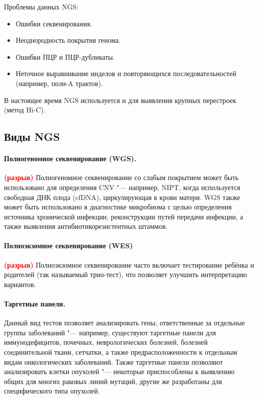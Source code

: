 \documentclass[a4paper,12pt]{article}
\newcommand{\spacing}{\textcolor{red}{\textbf{(разрыв)}}}
\begin{document}
Проблемы данных NGS:

\begin{itemize}
\item Ошибки секвенирования.
\item Неоднородность покрытия генома.
\item Ошибки ПЦР и ПЦР-дубликаты.
\item Неточное выравнивание инделов и повторяющихся последовательностей (например, поли-A трактов).
\end{itemize}

В настоящее время NGS используется и для выявления крупных перестроек (метод Hi-C).

\subsection{Виды NGS}

\paragraph{Полногеномное секвенирование (WGS).}
\spacing
Полногеномное секвенирование со слабым покрытием может быть использовано для определения CNV "--- например, NIPT, когда используется свободная ДНК плода (cfDNA), циркулирующая в крови матери\cite{yu}.
WGS также может быть использовано в диагностике микробиома с целью определения источника хронической инфекции, реконструкции путей передачи инфекции, а также выявления антибиотикорезистентных штаммов\cite{balloux}.

\paragraph{Полноэкзомное секвенирование (WES)}
\spacing
Полноэкзомное секвенирование часто включает тестирование ребёнка и родителей (так называемый трио-тест), что позволяет улучшить интерпретацию вариантов\cite{yohe}.

\paragraph{Таргетные панели.}
Данный вид тестов позволяет анализировать гены, ответственные за отдельные группы заболеваний "--- например, существуют таргетные панели для иммунодефицитов, почечных, неврологических болезней, болезней соединительной ткани, сетчатки, а также предрасположенности к отдельным видам онкологических заболеваний.
Также таргетные панели позволяют анализировать клетки опухолей "--- некоторые приспособлены к выявлению общих для многих раковых линий мутаций, другие же разработаны для специфического типа опухолей\cite{yohe}.
\end{document}
